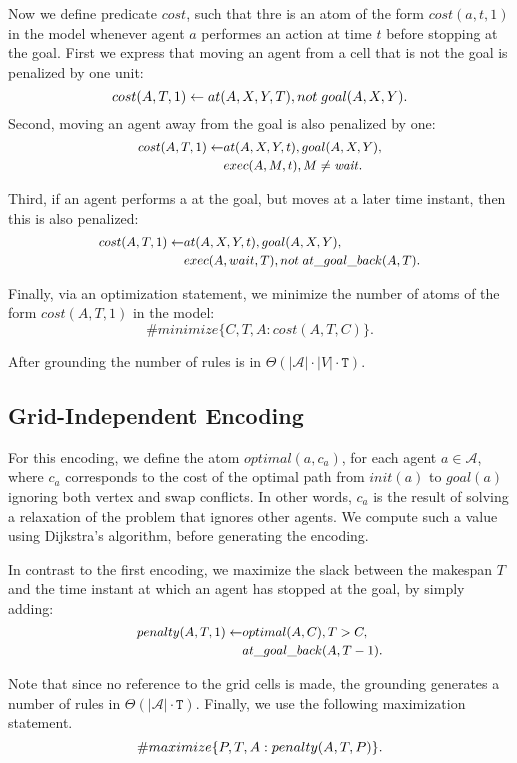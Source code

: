 Now we define predicate $cost$, such that thre is an atom of the form $cost(a,t,1)$ in the model whenever agent $a$ performes an action at time $t$ before stopping at the goal. First we express that moving an agent from a cell that is not the goal is penalized by one unit:
\begin{equation*}\small
cost(A,T,1) \leftarrow at(A,X,Y,T), not \; goal(A,X,Y).
\end{equation*}
Second, moving an agent away from the goal is also penalized by one:
\begin{equation*}\small
  \begin{split}
    cost(A,T,1) \leftarrow &at(A,X,Y,t), goal(A,X,Y), \\
    &exec(A,M,t), M \neq \Wait.
  \end{split}
  \end{equation*}

Third, if an agent performs a \Wait at the goal, but moves at a later time instant, then this is also penalized:
\begin{equation*}\small
  \begin{split}
    cost(A,T,1) \leftarrow &at(A,X,Y,t), goal(A,X,Y), \\
    &exec(A,wait,T), not \; at\_goal\_back(A,T).
  \end{split}
  \end{equation*}


Finally, via an optimization statement, we minimize the number of atoms of the form $cost(A,T,1)$ in the model:
\[ \#minimize \{C,T,A : cost(A,T,C)\}.\]

After grounding the number of rules is in $\Theta(|\mathcal{A}|\cdot|V| \cdot \mathtt{T})$.

\subsection{Grid-Independent Encoding}
For this encoding, we define the atom $optimal(a, c_a)$, for each agent $a\in \mathcal{A}$, where $c_a$ corresponds to the cost of the optimal path from $init(a)$ to $goal(a)$ ignoring both vertex and swap conflicts. In other words, $c_a$ is the result of solving a relaxation of the problem that ignores other agents. We compute such a value using Dijkstra's algorithm, before generating the encoding.

In contrast to the first encoding, we maximize the slack between the makespan $T$ and the time instant at which an agent has stopped at the goal, by simply adding:
\begin{equation*}\small
  \begin{split}
    penalty(A,T,1) \leftarrow &optimal(A,C), T > C, \\
    &at\_goal\_back(A,T-1).
\end{split}
\end{equation*}

Note that since no reference to the grid cells is made, the grounding generates a number of rules in $\Theta(|\mathcal{A}|\cdot\mathtt{T})$. Finally, we use the following maximization statement.
{\small\[ \small \#maximize \{P,T,A : penalty(A,T,P)\}.\]}

